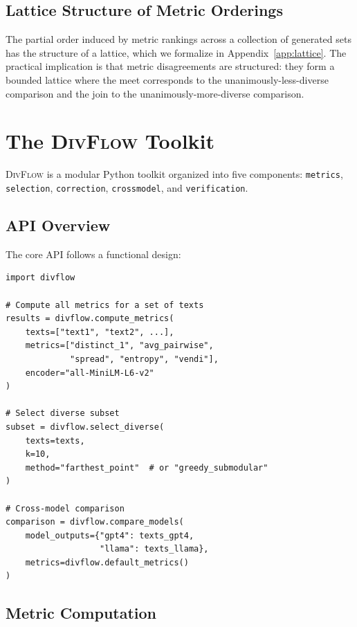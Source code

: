 \documentclass[11pt,a4paper]{article}
\newcommand{\divflow}{\textsc{DivFlow}}
\begin{document}
\subsection{Lattice Structure of Metric Orderings}

The partial order induced by metric rankings across a
collection of generated sets has the structure of a
lattice, which we formalize in Appendix~\ref{app:lattice}.
The practical implication is that metric disagreements
are structured: they form a bounded lattice where the
meet corresponds to the unanimously-less-diverse
comparison and the join to the unanimously-more-diverse
comparison.

\section{The \divflow{} Toolkit}\label{sec:toolkit}

\divflow{} is a modular Python toolkit organized into
five components: \texttt{metrics}, \texttt{selection},
\texttt{correction}, \texttt{crossmodel}, and
\texttt{verification}.

\subsection{API Overview}

The core API follows a functional design:

\begin{verbatim}
import divflow

# Compute all metrics for a set of texts
results = divflow.compute_metrics(
    texts=["text1", "text2", ...],
    metrics=["distinct_1", "avg_pairwise",
             "spread", "entropy", "vendi"],
    encoder="all-MiniLM-L6-v2"
)

# Select diverse subset
subset = divflow.select_diverse(
    texts=texts,
    k=10,
    method="farthest_point"  # or "greedy_submodular"
)

# Cross-model comparison
comparison = divflow.compare_models(
    model_outputs={"gpt4": texts_gpt4,
                   "llama": texts_llama},
    metrics=divflow.default_metrics()
)
\end{verbatim}

\subsection{Metric Computation}
\end{document}
